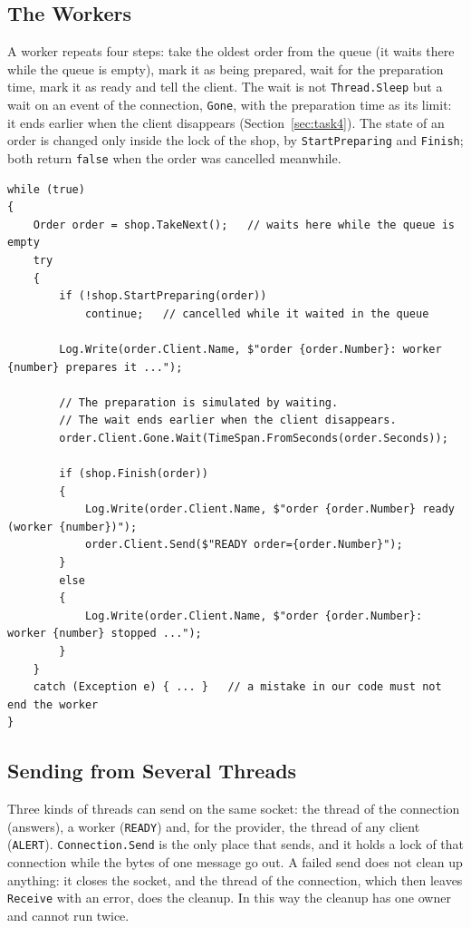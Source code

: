 \documentclass[12pt,a4paper]{article}
\begin{document}
\subsection{The Workers}

A worker repeats four steps: take the oldest order from the queue (it waits there while the queue is empty), mark it as being prepared, wait for the preparation time, mark it as ready and tell the client. The wait is not \texttt{Thread.Sleep} but a wait on an event of the connection, \texttt{Gone}, with the preparation time as its limit: it ends earlier when the client disappears (Section~\ref{sec:task4}). The state of an order is changed only inside the lock of the shop, by \texttt{StartPreparing} and \texttt{Finish}; both return \texttt{false} when the order was cancelled meanwhile.

\begin{lstlisting}[style=csharp,caption={A worker (Server.Work)}]
while (true)
{
    Order order = shop.TakeNext();   // waits here while the queue is empty
    try
    {
        if (!shop.StartPreparing(order))
            continue;   // cancelled while it waited in the queue

        Log.Write(order.Client.Name, $"order {order.Number}: worker {number} prepares it ...");

        // The preparation is simulated by waiting.
        // The wait ends earlier when the client disappears.
        order.Client.Gone.Wait(TimeSpan.FromSeconds(order.Seconds));

        if (shop.Finish(order))
        {
            Log.Write(order.Client.Name, $"order {order.Number} ready (worker {number})");
            order.Client.Send($"READY order={order.Number}");
        }
        else
        {
            Log.Write(order.Client.Name, $"order {order.Number}: worker {number} stopped ...");
        }
    }
    catch (Exception e) { ... }   // a mistake in our code must not end the worker
}
\end{lstlisting}

\subsection{Sending from Several Threads}

Three kinds of threads can send on the same socket: the thread of the connection (answers), a worker (\texttt{READY}) and, for the provider, the thread of any client (\texttt{ALERT}). \texttt{Connection.Send} is the only place that sends, and it holds a lock of that connection while the bytes of one message go out. A failed send does not clean up anything: it closes the socket, and the thread of the connection, which then leaves \texttt{Receive} with an error, does the cleanup. In this way the cleanup has one owner and cannot run twice.
\end{document}
